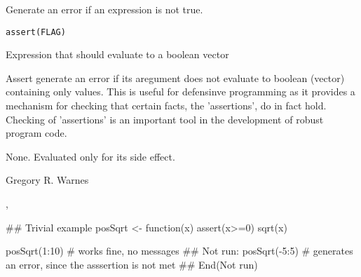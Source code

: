 \begin{Description}\relax
Generate an error if an expression is not true.
\end{Description}
\begin{Usage}
\begin{verbatim}
assert(FLAG)
\end{verbatim}
\end{Usage}
\begin{Arguments}
\begin{ldescription}
\item[\code{FLAG}] Expression that should evaluate to a boolean vector
\end{ldescription}
\end{Arguments}
\begin{Details}\relax
Assert generate an error if its aregument does not evaluate to 
boolean (vector) containing only  values.  This is useful
for defensinve programming as it provides a mechanism for checking
that certain facts, the 'assertions', do in fact hold.  Checking of 
'assertions' is an important tool in the development of robust program
code.
\end{Details}
\begin{Value}
None.  Evaluated only for its side effect.
\end{Value}
\begin{Author}\relax
Gregory R. Warnes 
\end{Author}
\begin{SeeAlso}\relax
{}, 
\end{SeeAlso}
\begin{Examples}
\begin{ExampleCode}

## Trivial example
posSqrt <- function(x)
  {
    assert(x>=0)
    sqrt(x)
  }

posSqrt(1:10) # works fine, no messages
## Not run: 
posSqrt(-5:5) # generates an error, since the asssertion is not met
## End(Not run)

\end{ExampleCode}
\end{Examples}

